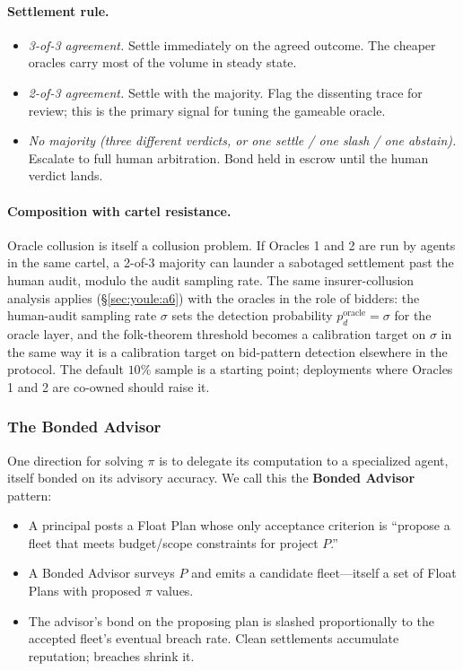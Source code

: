 \documentclass[11pt,a4paper]{article}
\theoremstyle{definition}
\theoremstyle{remark}
\begin{document}
\paragraph{Settlement rule.}
\begin{itemize}[nosep]
  \item \emph{3-of-3 agreement.} Settle immediately on the agreed outcome. The cheaper oracles carry most of the volume in steady state.
  \item \emph{2-of-3 agreement.} Settle with the majority. Flag the dissenting trace for review; this is the primary signal for tuning the gameable oracle.
  \item \emph{No majority (three different verdicts, or one settle / one slash / one abstain).} Escalate to full human arbitration. Bond held in escrow until the human verdict lands.
\end{itemize}

\paragraph{Composition with cartel resistance.}
Oracle collusion is itself a collusion problem. If Oracles 1 and 2 are run by agents in the same cartel, a 2-of-3 majority can launder a sabotaged settlement past the human audit, modulo the audit sampling rate. The same insurer-collusion analysis applies (\S\ref{sec:youle:a6}) with the oracles in the role of bidders: the human-audit sampling rate $\sigma$ sets the detection probability $p_d^{\text{oracle}} = \sigma$ for the oracle layer, and the folk-theorem threshold becomes a calibration target on $\sigma$ in the same way it is a calibration target on bid-pattern detection elsewhere in the protocol. The default $10\%$ sample is a starting point; deployments where Oracles 1 and 2 are co-owned should raise it.

\subsubsection{The Bonded Advisor}\label{sec:bonded-advisor}

One direction for solving $\pi$ is to delegate its computation to a specialized agent, itself bonded on its advisory accuracy. We call this the \textbf{Bonded Advisor} pattern:
\begin{itemize}[nosep]
  \item A principal posts a Float Plan whose only acceptance criterion is ``propose a fleet that meets budget/scope constraints for project $P$.''
  \item A Bonded Advisor surveys $P$ and emits a candidate fleet---itself a set of Float Plans with proposed $\pi$ values.
  \item The advisor's bond on the proposing plan is slashed proportionally to the accepted fleet's eventual breach rate. Clean settlements accumulate reputation; breaches shrink it.
\end{itemize}
\end{document}
